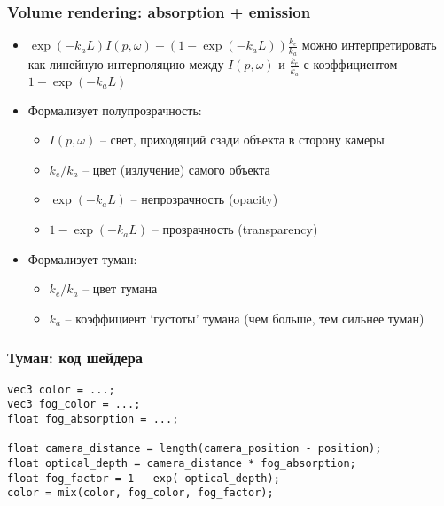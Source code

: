 \documentclass[10pt]{beamer}
\begin{document}
\begin{frame}[fragile]
\frametitle{Volume rendering: absorption + emission}
\begin{itemize}
\item \begin{math}\exp(-k_a L)I(p,\omega) + (1 - \exp(-k_a L))\frac{k_e}{k_a}\end{math} можно интерпретировать как линейную интерполяцию между \begin{math}I(p,\omega)\end{math} и \begin{math}\frac{k_e}{k_a}\end{math} с коэффициентом \begin{math}1 - \exp(-k_a L)\end{math}
\pause
\item Формализует полупрозрачность:
\begin{itemize}
\item \begin{math}I(p,\omega)\end{math} -- свет, приходящий сзади объекта в сторону камеры
\item \begin{math}k_e / k_a\end{math} -- цвет (излучение) самого объекта
\item \begin{math}\exp(-k_a L)\end{math} -- непрозрачность (opacity)
\item \begin{math}1 - \exp(-k_a L)\end{math} -- прозрачность (transparency)
\end{itemize}
\pause
\item Формализует туман:
\begin{itemize}
\item \begin{math}k_e / k_a\end{math} -- цвет тумана
\item \begin{math}k_a\end{math} -- коэффициент `густоты' тумана (чем больше, тем сильнее туман)
\end{itemize}
\end{itemize}
\end{frame}

\begin{frame}[fragile]
\frametitle{Туман: код шейдера}
\begin{verbatim}
vec3 color = ...;
vec3 fog_color = ...;
float fog_absorption = ...;

float camera_distance = length(camera_position - position);
float optical_depth = camera_distance * fog_absorption;
float fog_factor = 1 - exp(-optical_depth);
color = mix(color, fog_color, fog_factor);
\end{verbatim}
\end{frame}
\end{document}
